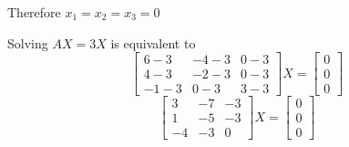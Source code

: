 \documentclass[a4paper, 11pt]{article}
\begin{document}
\begin{solution}
    Therefore \(x_1 = x_2 = x_3 = 0\)

    Solving \(AX = 3X\) is equivalent to \[
        \left[\begin{array}{ccc}
                6 -3   & -4 - 3 & 0 -3 \\
                4 -3   & -2 -3  & 0 -3 \\
                -1 - 3 & 0 -3   & 3 -3
            \end{array}\right] X = \left[\begin{array}{c}
                0 \\ 0 \\ 0
            \end{array}\right]
    \]
    \[
        \left[\begin{array}{ccc}
                3  & -7 & -3 \\
                1  & -5 & -3 \\
                -4 & -3 & 0
            \end{array}\right] X = \left[\begin{array}{c}
                0 \\ 0 \\ 0
            \end{array}\right]
    \]


\end{solution}
\end{document}
